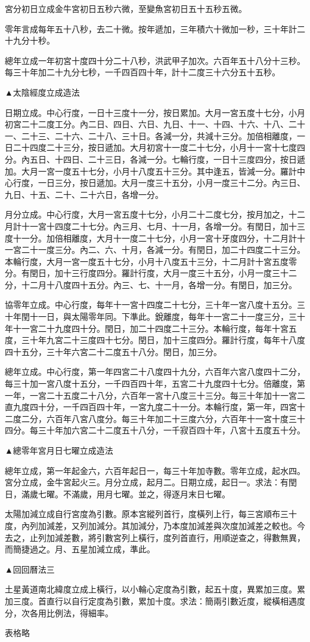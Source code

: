 宮分初日立成金牛宮初日五秒六微，至變魚宮初日五十五秒五微。

零年言成每年五十八秒，去二十微。按年遞加，三年積六十微加一秒，三十年計二十九分十秒。

總年立成一年初宮十度四十分二十八秒，洪武甲子加次。六百年五十八分十三秒。每三十年加二十九分七秒，一千四百四十年，計十二度三十六分五十五秒。

▲太陰經度立成造法

日期立成。中心行度，一日十三度十一分，按日累加。大月一宮五度十七分，小月初宮二十二度工分。內二日、四日、六日、九日、十一、十四、十六、十八、二十一、二十三、二十六、二十八、三十日。各減一分，共減十三分。加倍相離度，一日二十四度二十三分，按日遞加。大月初宮十一度二十七分，小月十一宮十七度四分。內五日、十四日、二十三日，各減一分。七輪行度，一日十三度四分，按日遞加。大月一宮一度五十七分，小月十八度五十三分。其中逢五，皆減一分。羅計中心行度，一日三分，按日遞加。大月一度三十五分，小月一度三十二分。內三日、九日、十五、二十、二十六日，各增一分。

月分立成。中心行度，大月一宮五度十七分，小月二十二度七分，按月加之，十二月計十一宮十四度二十七分。內三月、七月、十一月，各增一分。有閏日，加十三度十一分。加倍相離度，大月十一度二十七分，小月一宮十牙度四分，十二月計十一宮二十一度三分。內二、六、十月，各減一分。有閏日，加二十四度二十三分。本輪行度，大月一宮一度五十七分，小月十八度五十三分，十二月計十宮五度零分。有閏日，加十三行度四分。羅計行度，大月一度三十五分，小月一度三十二分，十二月十八度四十五分。內三、七、十一月，各增一分。有閏日，加三分。

協零年立成。中心行度，每年十一宮十四度二十七分，三十年一宮八度十五分。三十年閏十一日，與太陽零年同。下準此。銳離度，每年十一宮二十一度三分，三十年十一宮二十九度四十分。閏日，加二十四度二十三分。本輪行度，每年十宮五度，三十年九宮二十三度四十七分。閏日，加十三度四分。羅計行度，每年十八度四十五分，三十年六宮二十二度五十八分。閏日，加三分。

總年立成。中心行度，第一年四宮二十八度四十九分，六百年六宮八度四十二分，每三十加一宮八度十五分，一千四百四十年，五宮二十九度四十七分。倍離度，第一年，一宮二十五度二十八分，六百年一宮十八度三十三分。每三十年加十一宮二直九度四十分，一千四百四十年，一宮九度二十一分。本輪行度，第一年，四宮十二度二分，六百年八宮八度分。每三十年加二十三度六分，六百年十一宮十度三十四分。每三十年加六宮二十二度五十八分，一千寂百四十年，八宮十五度五十分。

▲總零年宮月日七曜立成造法

總年立成，第一年起金六，六百年起日一，每三十年加寺數。零年立成，起水四。宮分立成，金牛宮起火三。月分立成，起月二。日期立成，起日一。求法：有閏日，滿歲七曜。不滿歲，用月七曜。並之，得逐月末日七曜。

太陽加減立成自行宮度為引數。原本宮縱列首行，度橫列上行，每三宮順布三十度，內列加減差，又列加減分。其加減分，乃本度加減差與次度加減差之較也。今去之，止列加減差數，將引數宮列上橫行，度列首直行，用順逆查之，得數無異，而簡捷過之。月、五星加減立成，準此。

▲回回曆法三

土星黃道南北緯度立成上橫行，以小輪心定度為引數，起五十度，異累加三度。累加三度。首直行以自行定度為引數，累加十度。求法：簡兩引數近度，縱橫相遇度分，次各用比例法，得細率。

表格略
